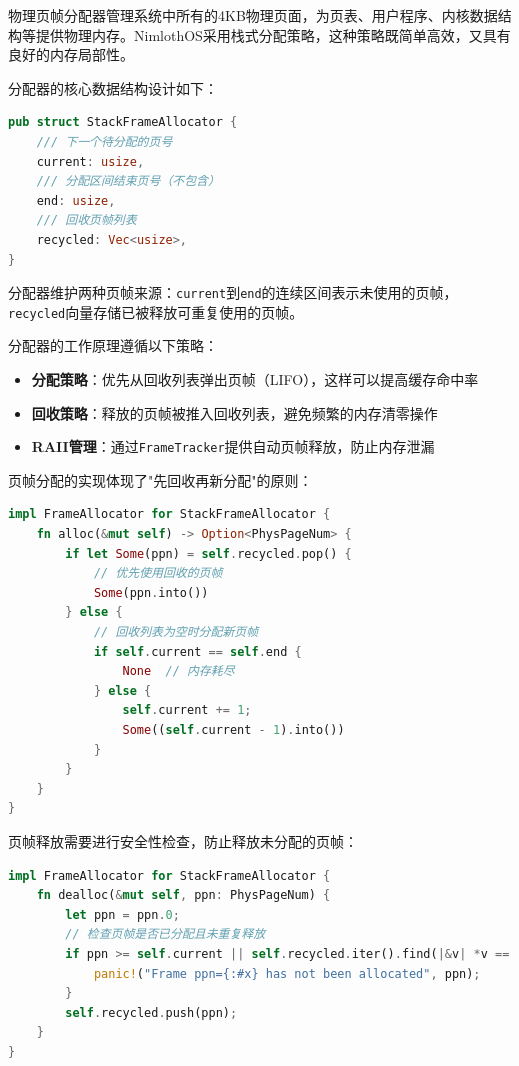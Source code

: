 物理页帧分配器管理系统中所有的4KB物理页面，为页表、用户程序、内核数据结构等提供物理内存。NimlothOS采用栈式分配策略，这种策略既简单高效，又具有良好的内存局部性。

分配器的核心数据结构设计如下：

\begin{lstlisting}[language=Rust,caption={栈式页帧分配器结构}, label={lst:frame-allocator-struct}]
pub struct StackFrameAllocator {
    /// 下一个待分配的页号
    current: usize,
    /// 分配区间结束页号（不包含）
    end: usize,
    /// 回收页帧列表
    recycled: Vec<usize>,
}
\end{lstlisting}

分配器维护两种页帧来源：\lstinline[language=Rust]{current}到\lstinline[language=Rust]{end}的连续区间表示未使用的页帧，\lstinline[language=Rust]{recycled}向量存储已被释放可重复使用的页帧。

分配器的工作原理遵循以下策略：

\begin{itemize}
    \item \textbf{分配策略}：优先从回收列表弹出页帧（LIFO），这样可以提高缓存命中率
    \item \textbf{回收策略}：释放的页帧被推入回收列表，避免频繁的内存清零操作
    \item \textbf{RAII管理}：通过\lstinline[language=Rust]{FrameTracker}提供自动页帧释放，防止内存泄漏
\end{itemize}

页帧分配的实现体现了"先回收再新分配"的原则：

\begin{lstlisting}[language=Rust,caption={页帧分配逻辑}, label={lst:frame-alloc-logic}]
impl FrameAllocator for StackFrameAllocator {
    fn alloc(&mut self) -> Option<PhysPageNum> {
        if let Some(ppn) = self.recycled.pop() {
            // 优先使用回收的页帧
            Some(ppn.into())
        } else {
            // 回收列表为空时分配新页帧
            if self.current == self.end {
                None  // 内存耗尽
            } else {
                self.current += 1;
                Some((self.current - 1).into())
            }
        }
    }
}
\end{lstlisting}

页帧释放需要进行安全性检查，防止释放未分配的页帧：

\begin{lstlisting}[language=Rust,caption={页帧释放逻辑}, label={lst:frame-dealloc-logic}]
impl FrameAllocator for StackFrameAllocator {
    fn dealloc(&mut self, ppn: PhysPageNum) {
        let ppn = ppn.0;
        // 检查页帧是否已分配且未重复释放
        if ppn >= self.current || self.recycled.iter().find(|&v| *v == ppn).is_some() {
            panic!("Frame ppn={:#x} has not been allocated", ppn);
        }
        self.recycled.push(ppn);
    }
}
\end{lstlisting}

